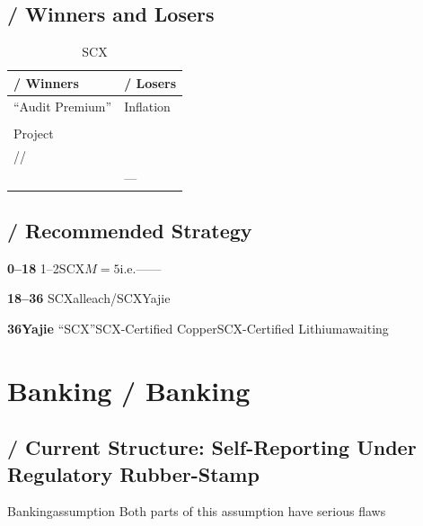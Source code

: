 \documentclass[12pt,a4paper]{article}
\theoremstyle{remark}
\begin{document}
\subsection{ / Winners and Losers}

\begin{table}[H]
\centering
\caption{SCX}
\label{tab:res_wl}
\begin{tabular}{@{}p{7cm}p{7cm}@{}}
\toprule
\textbf{ / Winners} & \textbf{ / Losers} \\
\midrule
``Audit Premium'' & Inflation \\
\addlinespace
 &  \\
\addlinespace
Project &  \\
\addlinespace
// &  \\
\addlinespace
 & — \\
\bottomrule
\end{tabular}
\end{table}

\subsection{ / Recommended Strategy}

\textbf{0--18}
1--2SCX$M=5$i.e.——

\textbf{18--36}
SCXalleach/SCXYajie

\textbf{36Yajie}
``SCX''SCX-Certified CopperSCX-Certified Lithiumawaiting


\section{Banking / Banking}

\subsection{ / Current Structure: Self-Reporting Under Regulatory Rubber-Stamp}

Bankingassumption\textbf{}
Both parts of this assumption have serious flaws
\end{document}
